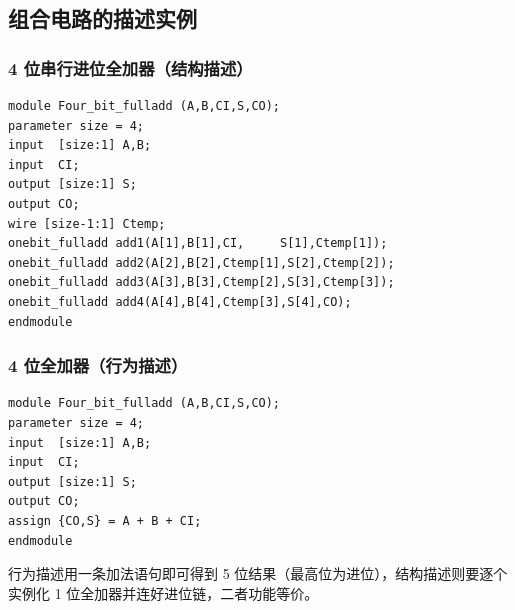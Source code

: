\subsection{组合电路的描述实例}
\subsubsection{4 位串行进位全加器（结构描述）}
\begin{verbatim}
module Four_bit_fulladd (A,B,CI,S,CO);
parameter size = 4;
input  [size:1] A,B;
input  CI;
output [size:1] S;
output CO;
wire [size-1:1] Ctemp;
onebit_fulladd add1(A[1],B[1],CI,     S[1],Ctemp[1]);
onebit_fulladd add2(A[2],B[2],Ctemp[1],S[2],Ctemp[2]);
onebit_fulladd add3(A[3],B[3],Ctemp[2],S[3],Ctemp[3]);
onebit_fulladd add4(A[4],B[4],Ctemp[3],S[4],CO);
endmodule
\end{verbatim}

\subsubsection{4 位全加器（行为描述）}
\begin{verbatim}
module Four_bit_fulladd (A,B,CI,S,CO);
parameter size = 4;
input  [size:1] A,B;
input  CI;
output [size:1] S;
output CO;
assign {CO,S} = A + B + CI;
endmodule
\end{verbatim}
行为描述用一条加法语句即可得到 5 位结果（最高位为进位），结构描述则要逐个实例化 1 位全加器并连好进位链，二者功能等价。
